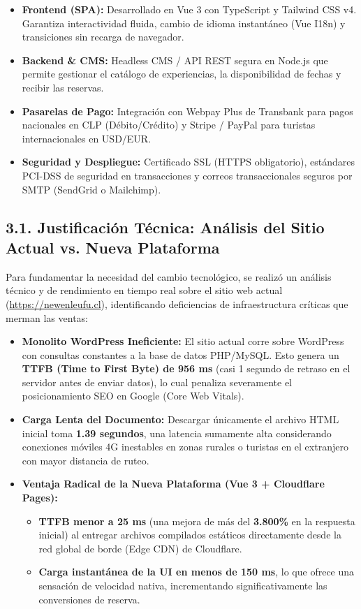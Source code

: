 \documentclass[11pt,a4paper]{article}
\begin{document}
\begin{itemize}[label=\textcolor{greennewen}{$\bullet$}]
    \item \textbf{Frontend (SPA):} Desarrollado en Vue 3 con TypeScript y Tailwind CSS v4. Garantiza interactividad fluida, cambio de idioma instantáneo (Vue I18n) y transiciones sin recarga de navegador.
    \item \textbf{Backend \& CMS:} Headless CMS / API REST segura en Node.js que permite gestionar el catálogo de experiencias, la disponibilidad de fechas y recibir las reservas.
    \item \textbf{Pasarelas de Pago:} Integración con Webpay Plus de Transbank para pagos nacionales en CLP (Débito/Crédito) y Stripe / PayPal para turistas internacionales en USD/EUR.
    \item \textbf{Seguridad y Despliegue:} Certificado SSL (HTTPS obligatorio), estándares PCI-DSS de seguridad en transacciones y correos transaccionales seguros por SMTP (SendGrid o Mailchimp).
\end{itemize}

\subsection{3.1. Justificación Técnica: Análisis del Sitio Actual vs. Nueva Plataforma}
Para fundamentar la necesidad del cambio tecnológico, se realizó un análisis técnico y de rendimiento en tiempo real sobre el sitio web actual (\url{https://newenleufu.cl}), identificando deficiencias de infraestructura críticas que merman las ventas:

\begin{itemize}[itemsep=2pt]
    \item \textbf{Monolito WordPress Ineficiente:} El sitio actual corre sobre WordPress con consultas constantes a la base de datos PHP/MySQL. Esto genera un \textbf{TTFB (Time to First Byte) de 956 ms} (casi 1 segundo de retraso en el servidor antes de enviar datos), lo cual penaliza severamente el posicionamiento SEO en Google (Core Web Vitals).
    \item \textbf{Carga Lenta del Documento:} Descargar únicamente el archivo HTML inicial toma \textbf{1.39 segundos}, una latencia sumamente alta considerando conexiones móviles 4G inestables en zonas rurales o turistas en el extranjero con mayor distancia de ruteo.
    \item \textbf{Ventaja Radical de la Nueva Plataforma (Vue 3 + Cloudflare Pages):}
    \begin{itemize}
        \item \textbf{TTFB menor a 25 ms} (una mejora de más del \textbf{3.800\%} en la respuesta inicial) al entregar archivos compilados estáticos directamente desde la red global de borde (Edge CDN) de Cloudflare.
        \item \textbf{Carga instantánea de la UI en menos de 150 ms}, lo que ofrece una sensación de velocidad nativa, incrementando significativamente las conversiones de reserva.
    \end{itemize}
\end{itemize}
\end{document}
